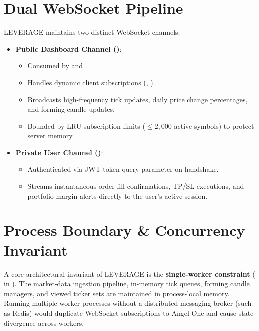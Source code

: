 \section{Dual WebSocket Pipeline}
LEVERAGE maintains two distinct WebSocket channels:
\begin{itemize}[leftmargin=6mm,itemsep=2mm]
    \item \textbf{Public Dashboard Channel ()}:
    \begin{itemize}[leftmargin=4mm]
        \item Consumed by  and .
        \item Handles dynamic client subscriptions (, ).
        \item Broadcasts high-frequency tick updates, daily price change percentages, and forming candle updates.
        \item Bounded by LRU subscription limits ($\le 2,000$ active symbols) to protect server memory.
    \end{itemize}
    \item \textbf{Private User Channel ()}:
    \begin{itemize}[leftmargin=4mm]
        \item Authenticated via JWT token query parameter on handshake.
        \item Streams instantaneous order fill confirmations, TP/SL executions, and portfolio margin alerts directly to the user's active session.
    \end{itemize}
\end{itemize}

\section{Process Boundary \& Concurrency Invariant}
A core architectural invariant of LEVERAGE is the \textbf{single-worker constraint} ( in ). The market-data ingestion pipeline, in-memory tick queues, forming candle managers, and viewed ticker sets are maintained in process-local memory. Running multiple worker processes without a distributed messaging broker (such as Redis) would duplicate WebSocket subscriptions to Angel One and cause state divergence across workers.
